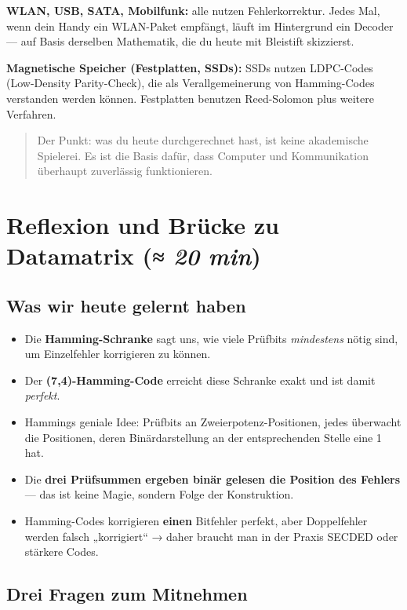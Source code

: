 \textbf{WLAN, USB, SATA, Mobilfunk:} alle nutzen Fehlerkorrektur. Jedes
Mal, wenn dein Handy ein WLAN-Paket empfängt, läuft im Hintergrund ein
Decoder — auf Basis derselben Mathematik, die du heute mit Bleistift
skizzierst.

\textbf{Magnetische Speicher (Festplatten, SSDs):} SSDs nutzen
LDPC-Codes (Low-Density Parity-Check), die als Verallgemeinerung von
Hamming-Codes verstanden werden können. Festplatten benutzen
Reed-Solomon plus weitere Verfahren.

\begin{quote}
Der Punkt: was du heute durchgerechnet hast, ist keine akademische
Spielerei. Es ist die Basis dafür, dass Computer und Kommunikation
überhaupt zuverlässig funktionieren.
\end{quote}

\section{Reflexion und Brücke zu Datamatrix \normalfont(\textit{≈ 20 min})}

\subsection*{Was wir heute gelernt haben}

\begin{itemize}
\item Die \textbf{Hamming-Schranke} sagt uns, wie viele Prüfbits
  \emph{mindestens} nötig sind, um Einzelfehler korrigieren zu können.
\item Der \textbf{(7,4)-Hamming-Code} erreicht diese Schranke exakt
  und ist damit \emph{perfekt}.
\item Hammings geniale Idee: Prüfbits an Zweierpotenz-Positionen, jedes
  überwacht die Positionen, deren Binärdarstellung an der entsprechenden
  Stelle eine 1 hat.
\item Die \textbf{drei Prüfsummen ergeben binär gelesen die Position
  des Fehlers} — das ist keine Magie, sondern Folge der Konstruktion.
\item Hamming-Codes korrigieren \textbf{einen} Bitfehler perfekt, aber
  Doppelfehler werden falsch „korrigiert“ → daher braucht man in der
  Praxis SECDED oder stärkere Codes.
\end{itemize}

\subsection*{Drei Fragen zum Mitnehmen}


